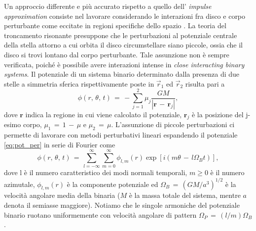 Un approccio differente e più accurato rispetto a quello dell' \textit{impulse approximation} consiste nel lavorare considerando le interazioni fra disco e corpo perturbante come eccitate in regioni specifiche dello spazio \parencite{GoldreichTremaine1980}.
La teoria del troncamento risonante presuppone che le perturbazioni al potenziale centrale della stella attorno a cui orbita il disco circumstellare siano piccole, ossia che il disco si trovi lontano dal corpo perturbante. 
Tale assunzione non è sempre verificata, poiché è possibile avere interazioni intense in \textit{close interacting binary systems}.
Il potenziale di un sistema binario determinato dalla presenza di due stelle a simmetria sferica rispettivamente poste in $\Vec{r}_1$ ed $\Vec{r}_2$ risulta pari a 
\begin{equation}
\phi(r,\,\theta,\,t)\,=\,-\sum_{j=1}^2 \mu_j \frac{GM}{|\mathbf{r}\,-\,\mathbf{r}_j|},
\label{eq:pot_per}
\end{equation}
dove $\mathbf{r}$ indica la regione in cui viene calcolato il potenziale, $\mathbf{r}_j$ è la posizione del j-esimo corpo, $\mu_1\,=\,1\,-\,\mu$ e $\mu_2\,=\,\mu$.
L'assunzione di piccole perturbazioni ci permette di lavorare con metodi perturbativi lineari espandendo il potenziale \eqref{eq:pot_per} in serie di Fourier \parencite{GoldreichTremaine1980} come
\begin{equation}
\phi(r,\,\theta,\,t)\,=\,\sum_{l=-\infty}^{\infty} \sum_{m=0}^{\infty}\phi_{l,m}(r)\exp{[i(m\theta\,-\,l\Omega_{B}t)]},
\label{eq:esp_tay}
\end{equation}
dove l è il numero caratteristico dei modi normali temporali, $m \geq 0$ è il numero azimutale, $\phi_{l,m}(r)$ è la componente potenziale ed $\Omega_B\,=\,(GM/a^3)^{1/2}$ è la velocità angolare media della binaria ($M$ è la massa totale del sistema, mentre $a$ denota il semiasse maggiore). Notiamo che le singole armoniche del potenziale binario ruotano uniformemente con velocità angolare di pattern $\Omega_P\,=\,(l/m)\Omega_B$.


